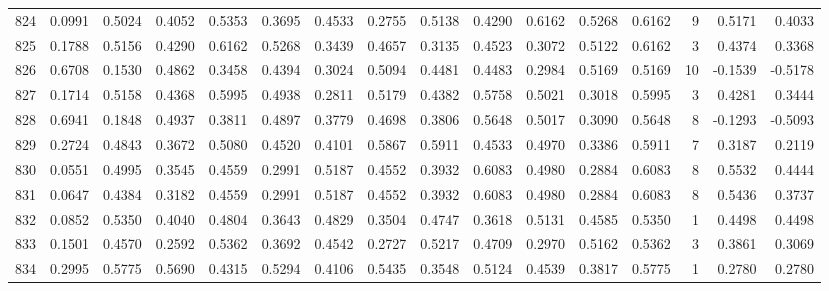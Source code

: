 \begin{tabular}{lrrrrrrrrrrrrrrr}
824 &      0.0991 &  0.5024 &  0.4052 &  0.5353 &  0.3695 &  0.4533 &  0.2755 &  0.5138 &  0.4290 &  0.6162 &   0.5268 &     0.6162 &      9 &                    0.5171 &                     0.4033 \\
825 &      0.1788 &  0.5156 &  0.4290 &  0.6162 &  0.5268 &  0.3439 &  0.4657 &  0.3135 &  0.4523 &  0.3072 &   0.5122 &     0.6162 &      3 &                    0.4374 &                     0.3368 \\
826 &      0.6708 &  0.1530 &  0.4862 &  0.3458 &  0.4394 &  0.3024 &  0.5094 &  0.4481 &  0.4483 &  0.2984 &   0.5169 &     0.5169 &     10 &                   -0.1539 &                    -0.5178 \\
827 &      0.1714 &  0.5158 &  0.4368 &  0.5995 &  0.4938 &  0.2811 &  0.5179 &  0.4382 &  0.5758 &  0.5021 &   0.3018 &     0.5995 &      3 &                    0.4281 &                     0.3444 \\
828 &      0.6941 &  0.1848 &  0.4937 &  0.3811 &  0.4897 &  0.3779 &  0.4698 &  0.3806 &  0.5648 &  0.5017 &   0.3090 &     0.5648 &      8 &                   -0.1293 &                    -0.5093 \\
829 &      0.2724 &  0.4843 &  0.3672 &  0.5080 &  0.4520 &  0.4101 &  0.5867 &  0.5911 &  0.4533 &  0.4970 &   0.3386 &     0.5911 &      7 &                    0.3187 &                     0.2119 \\
830 &      0.0551 &  0.4995 &  0.3545 &  0.4559 &  0.2991 &  0.5187 &  0.4552 &  0.3932 &  0.6083 &  0.4980 &   0.2884 &     0.6083 &      8 &                    0.5532 &                     0.4444 \\
831 &      0.0647 &  0.4384 &  0.3182 &  0.4559 &  0.2991 &  0.5187 &  0.4552 &  0.3932 &  0.6083 &  0.4980 &   0.2884 &     0.6083 &      8 &                    0.5436 &                     0.3737 \\
832 &      0.0852 &  0.5350 &  0.4040 &  0.4804 &  0.3643 &  0.4829 &  0.3504 &  0.4747 &  0.3618 &  0.5131 &   0.4585 &     0.5350 &      1 &                    0.4498 &                     0.4498 \\
833 &      0.1501 &  0.4570 &  0.2592 &  0.5362 &  0.3692 &  0.4542 &  0.2727 &  0.5217 &  0.4709 &  0.2970 &   0.5162 &     0.5362 &      3 &                    0.3861 &                     0.3069 \\
834 &      0.2995 &  0.5775 &  0.5690 &  0.4315 &  0.5294 &  0.4106 &  0.5435 &  0.3548 &  0.5124 &  0.4539 &   0.3817 &     0.5775 &      1 &                    0.2780 &                     0.2780 \\

\end{tabular}
